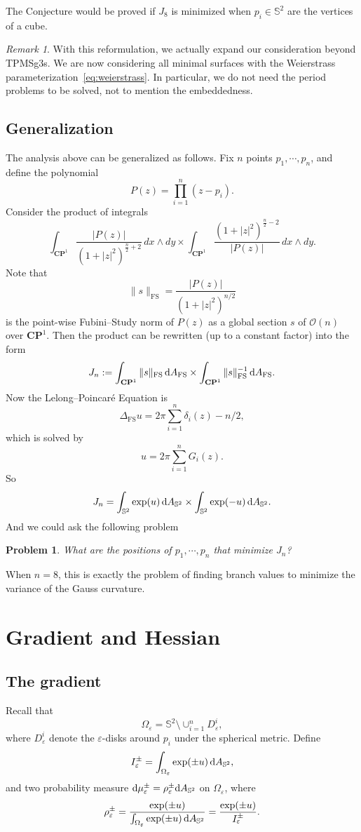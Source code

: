 \documentclass[a4paper]{amsart}
\newcommand{\CP}{\mathbf{CP}}
\newcommand{\cO}{\mathcal{O}}
\newcommand{\FS}{\text{FS}}
\newcommand{\uS}{\mathbb{S}}
\newcommand{\sph}{{\uS^2}}
\newcommand{\laplace}{\Delta}
\newcommand{\dd}{{\rm d}}
\theoremstyle{plain} %
\newtheorem*{problem}{Problem}
\theoremstyle{definition} %
\theoremstyle{remark}
\newtheorem{remark}{Remark}
\begin{document}
The Conjecture would be proved if $J_8$ is minimized when $p_i \in \uS^2$ are
the vertices of a cube.

\begin{remark}
	With this reformulation, we actually expand our consideration beyond TPMSg3s.
	We are now considering all minimal surfaces with the Weierstrass
	parameterization~\eqref{eq:weierstrass}.  In particular, we do not need the
	period problems to be solved, not to mention the embeddedness.
\end{remark}

\subsection{Generalization}

The analysis above can be generalized as follows.  Fix $n$ points $p_1, \cdots, p_n$, and define the polynomial
\[
	P(z) = \prod_{i=1}^n (z-p_i).
\]
Consider the product of integrals
\[
	\int_{\CP^1} \frac{|P(z)|}{(1+|z|^2)^{\frac{n}{2}+2}} \, dx \wedge dy \times
	\int_{\CP^1} \frac{(1+|z|^2)^{\frac{n}{2}-2}}{|P(z)|} \, dx \wedge dy.
\]
Note that
\[
	\|s\|_\FS = \frac{|P(z)|}{(1+|z|^2)^{n/2}}
\]
is the point-wise Fubini--Study norm of $P(z)$ as a global section $s$ of
$\cO(n)$ over $\CP^1$. Then the product can be rewritten (up to a constant
factor) into the form
\[
	J_n :=
	\int_{\CP^1} \| s \|_\FS \, \dd A_\FS \times
	\int_{\CP^1} \| s \|_\FS^{-1} \, \dd A_\FS. 
\]
Now the Lelong--Poincar\'e Equation is
\[
	\laplace_\FS u = 2\pi \sum_{i=1}^n \delta_i(z) - n/2,
\]
which is solved by
\[
	u = 2\pi \sum_{i=1}^n G_i(z).
\]
So
\[
	J_n = 
	\int_{\uS^2} \exp(u) \, \dd A_\sph \times
	\int_{\uS^2} \exp(-u) \, \dd A_\sph.
\]
And we could ask the following problem
\begin{problem}
	What are the positions of $p_1, \cdots, p_n$ that minimize $J_n$?
\end{problem}
When $n = 8$, this is exactly the problem of finding branch values to minimize
the variance of the Gauss curvature.

\section{Gradient and Hessian}

\subsection{The gradient}

Recall that
\[
	\Omega_\varepsilon = \uS^2 \setminus \cup_{i=1}^n D^i_\varepsilon,
\]
where $D^i_\varepsilon$ denote the $\varepsilon$-disks around $p_i$ under the
spherical metric.  Define
\[
	I^\pm_\varepsilon = \int_{\Omega_\varepsilon} \exp(\pm u) \, \dd A_\sph,
\]
and two probability measure $\dd\mu^\pm_\varepsilon = \rho^\pm_\varepsilon \dd
A_\sph$ on $\Omega_\varepsilon$, where
\[
	\rho_\varepsilon^\pm
	= \frac{\exp(\pm u)}{\int_{\Omega_\varepsilon} \exp(\pm u) \, \dd A_\sph}
	= \frac{\exp(\pm u)}{I^\pm_\varepsilon}.
\]
\end{document}
